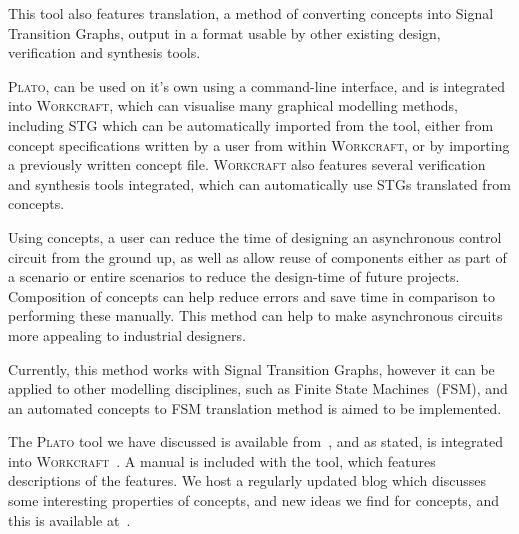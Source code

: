 \documentclass[british,conference,compsoc]{IEEEtran}
\newcommand{\noun}[1]{\textsc{#1}}
\begin{document}
This tool also features translation, a method of converting concepts into Signal
Transition Graphs, output in a format usable by other existing design, 
verification and synthesis tools. 

\noun{Plato}, can be used on it's own using a command-line interface, and is
integrated into \noun{Workcraft}, which can visualise many graphical modelling
methods, including STG which can be automatically imported from the
tool, either from concept specifications written by a user from within 
\noun{Workcraft}, or by importing a previously written concept file.
\noun{Workcraft} also features several verification and synthesis tools 
integrated, which can automatically use STGs translated from concepts. 

Using concepts, a user can reduce the time of designing an asynchronous
control circuit from the ground up, as well as allow reuse of components
either as part of a scenario or entire scenarios to reduce the design-time
of future projects. Composition of concepts can help
reduce errors and save time in comparison to performing these manually.
This method can help to make asynchronous circuits more appealing
to industrial designers.

Currently, this method works with Signal Transition Graphs, however
it can be applied to other modelling disciplines, such as Finite State
Machines~(FSM), and an automated concepts to FSM translation method
is aimed to be implemented.


The \noun{Plato} tool we have discussed is available 
from~\cite{2016_concepts_github}, and as stated, is integrated into 
\noun{Workcraft}~\cite{Workcraft_website}. A manual is included with the tool, 
which features descriptions of the features. We host a regularly updated blog 
which discusses some interesting properties of concepts, and new ideas we find 
for concepts, and this is available  at~\cite{2016_blog_concepts}.




\end{document}
